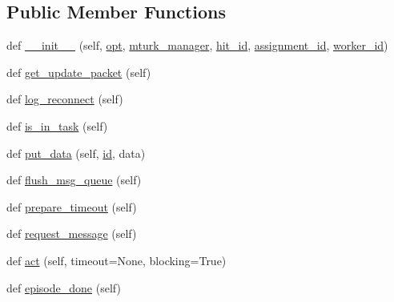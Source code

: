 \subsection*{Public Member Functions}
\begin{DoxyCompactItemize}
\item 
def \hyperlink{classmock__turk__agent_1_1MockTurkAgent_a7582b967521620537272a6ad5fb4dfb0}{\+\_\+\+\_\+init\+\_\+\+\_\+} (self, \hyperlink{classparlai_1_1core_1_1agents_1_1Agent_ab3b45d2754244608c75d4068b90cd051}{opt}, \hyperlink{classparlai_1_1mturk_1_1core_1_1agents_1_1MTurkAgent_ae3fddc0185f75ea64b09a86628d4a1d1}{mturk\+\_\+manager}, \hyperlink{classparlai_1_1mturk_1_1core_1_1agents_1_1MTurkAgent_a4325d1370d25335d4a7ad279d7d0c615}{hit\+\_\+id}, \hyperlink{classparlai_1_1mturk_1_1core_1_1agents_1_1MTurkAgent_ada9c2a6ca3ee222f73743b2bc3a9d85f}{assignment\+\_\+id}, \hyperlink{classparlai_1_1mturk_1_1core_1_1agents_1_1MTurkAgent_a88699f19c4c7e658ae0424062cbb9d80}{worker\+\_\+id})
\item 
def \hyperlink{classmock__turk__agent_1_1MockTurkAgent_a4e5f98ce759842f8fadad41360b1d67b}{get\+\_\+update\+\_\+packet} (self)
\item 
def \hyperlink{classmock__turk__agent_1_1MockTurkAgent_a915e5af5396b55318d3d2935baa7e7b4}{log\+\_\+reconnect} (self)
\item 
def \hyperlink{classmock__turk__agent_1_1MockTurkAgent_a120b2e61c3c1d822e61c94a67a9ff08b}{is\+\_\+in\+\_\+task} (self)
\item 
def \hyperlink{classmock__turk__agent_1_1MockTurkAgent_ab43d406bc647f1adc4122654707f9f5c}{put\+\_\+data} (self, \hyperlink{classmock__turk__agent_1_1MockTurkAgent_af82e21ecd7246741aa92bf4a01982984}{id}, data)
\item 
def \hyperlink{classmock__turk__agent_1_1MockTurkAgent_a614d570506381e5be546491435146d93}{flush\+\_\+msg\+\_\+queue} (self)
\item 
def \hyperlink{classmock__turk__agent_1_1MockTurkAgent_af18590a623c605ad01d5b553addee515}{prepare\+\_\+timeout} (self)
\item 
def \hyperlink{classmock__turk__agent_1_1MockTurkAgent_a2083b9c54bdccab9318ad8a08ab554ac}{request\+\_\+message} (self)
\item 
def \hyperlink{classmock__turk__agent_1_1MockTurkAgent_ab13b462e5ae6d55f19f180b3f9006acd}{act} (self, timeout=None, blocking=True)
\item 
def \hyperlink{classmock__turk__agent_1_1MockTurkAgent_a3c083d9aa6c25b0ae0060d35118199a9}{episode\+\_\+done} (self)

\end{DoxyCompactItemize}
